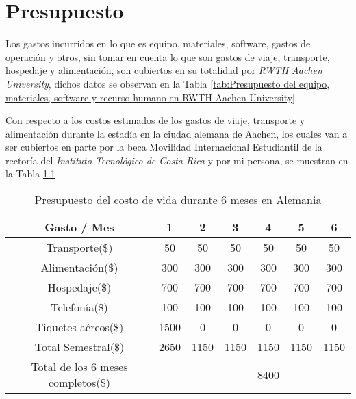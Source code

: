 

\chapter{Presupuesto}
\label{ch:Presupuesto}

Los gastos incurridos en lo que es equipo, materiales, software, gastos de operación y otros, sin
tomar en cuenta lo que son gastos de viaje, transporte, hospedaje y alimentación, son cubiertos
en su totalidad por \textit{RWTH Aachen University}, dichos datos se observan en la Tabla
\ref{tab:Presupuesto del equipo, materiales, software y recurso humano en RWTH Aachen University}

Con respecto a los costos estimados de los gastos de viaje, transporte y alimentación durante la
estadía en la ciudad alemana de Aachen, los cuales van a ser cubiertos en parte por la beca Movilidad
Internacional Estudiantil de la rectoría del \textit{Instituto Tecnológico de Costa Rica} y por mi persona,
se muestran en la Tabla \ref{tab:Presupuesto del costo de vida durante 6 meses en Alemania}

\begin{table}[ht]

  \caption{Presupuesto del costo de vida durante 6 meses en Alemania}
  \centering
  \begin{tabular}{| c | c | c | c | c | c | c |}
   \hline\hline
   Gasto / Mes 		& 1   & 2 & 3 & 4 & 5 & 6 			\\ \hline\hline
   Transporte(\$) 	& 50  & 50 & 50 & 50 & 50 & 50 			\\ \hline
   Alimentación(\$) 	& 300 & 300 & 300 & 300 & 300 & 300 		\\ \hline
   Hospedaje(\$) 	& 700 & 700 & 700 & 700 & 700 & 700 		\\ \hline
   Telefonía(\$) 	& 100 & 100 & 100 & 100 & 100 & 100 		\\ \hline
   Tiquetes aéreos(\$) & 1500 & 0 & 0 & 0 & 0 & 0 			\\ \hline
   Total Semestral(\$) & 2650 & 1150 & 1150 & 1150 & 1150 & 1150	\\ \hline
   Total de los 6 meses completos(\$) & \multicolumn{1}{r}{}  & \multicolumn{1}{r}{} & \multicolumn{1}{r}{} & \multicolumn{1}{r}{8400} & \multicolumn{1}{r}{} & \multicolumn{1}{r|}{} 	\\ \hline\hline

   
  \end{tabular}
  \label{tab:Presupuesto del costo de vida durante 6 meses en Alemania}
 
  
\end{table}


